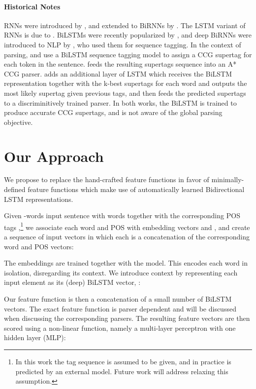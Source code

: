 \documentclass[11pt]{article}
\begin{document}
\paragraph{Historical Notes}
RNNs were introduced by , and extended to BiRNNs by
.  The LSTM variant of RNNs is due to
.  \mbox{BiLSTMs} were recently popularized by , and deep
BiRNNs were introduced to NLP by , who
used them for sequence tagging. 
In the context of parsing,  and  use a \mbox{BiLSTM} sequence tagging model to assign a CCG supertag for each token in the sentence.   feeds the resulting supertags sequence into an A* CCG parser. 
 adds an additional layer of LSTM which receives the \mbox{BiLSTM} representation together with the k-best supertags for each word and outputs the most likely supertag given previous tags, and then feeds the predicted supertags to a discriminitively trained parser. In both works, the \mbox{BiLSTM} is trained to produce accurate CCG supertags, and is not aware of the global parsing objective.
\section{Our Approach}
\label{sec:method}

We propose to replace the hand-crafted feature functions in favor of
minimally-defined feature functions which make use of automatically learned Bidirectional LSTM
representations.

Given -words input sentence  with words  together with the
corresponding POS tags ,\footnote{
In this work the tag sequence is assumed to be given, and in practice is predicted by an external model. Future work will address relaxing
this assumption.} we associate each word  and POS  with embedding
vectors  and , and create a sequence of input vectors
 in which each
 is a concatenation of the corresponding word and POS vectors:

The embeddings are trained together with the model.
This encodes each word in isolation, disregarding its context. We introduce
context by representing each input element as its (deep) \mbox{BiLSTM} vector, :

Our feature function  is then a concatenation of a small number of
BiLSTM vectors.  The exact feature function is parser dependent and will be
discussed when discussing the corresponding parsers.  The resulting feature
vectors are then scored using a non-linear function, namely a multi-layer
perceptron with one hidden layer (MLP):
\end{document}
